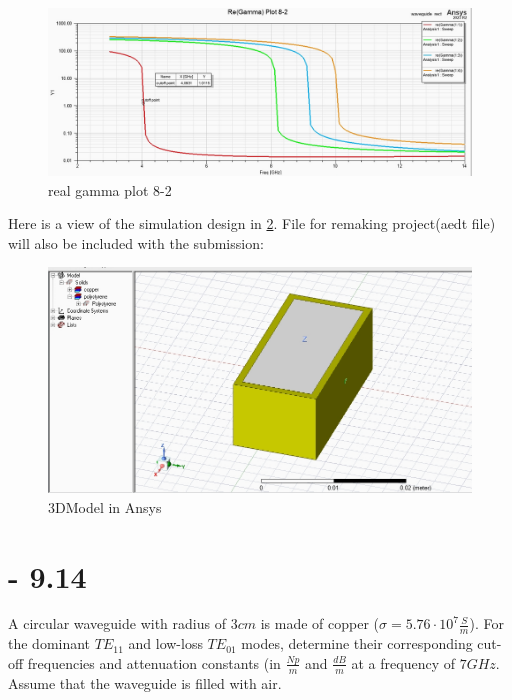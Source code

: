 \documentclass[12pt]{article}
\begin{document}
  \begin{center}
\begin{figure}[h]
    \centering
    \includegraphics[width=16cm]{./images/re_gamma_plot_8-2.png}
    \caption{real gamma plot 8-2}
    \label{fig:8-2-2}
  \end{figure}
\end{center}  
\newpage
\noindent
Here is a view of the simulation design in \ref{fig:ansys_model_8-2}. File for remaking project(aedt file) will also be included with the submission:
\begin{center}
\begin{figure}[h]
    \centering
    \includegraphics[width=16cm]{./images/design.png}
    \caption{3DModel in Ansys}
    \label{fig:ansys_model_8-2}
  \end{figure}
\end{center}
\newpage

\section{- 9.14}
A circular waveguide with radius of $3 cm$ is made of copper ($\sigma = 5.76\cdot 10^7 \frac{S}{m}$). For the dominant $TE_{11}$ and low-loss $TE_{01}$ modes, determine their corresponding cut-off frequencies and attenuation constants (in $\frac{Np}{m}$ and $\frac{dB}{m}$ at a frequency of $7 GHz$. Assume that the waveguide is filled with air.\\
\end{document}
